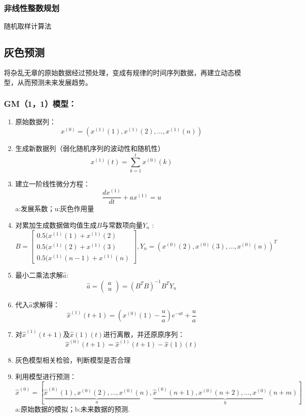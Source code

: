 \documentclass[12pt,a4paper]{article}
\begin{document}
\subsubsection{非线性整数规划}
随机取样计算法

\subsection{灰色预测}
将杂乱无章的原始数据经过预处理，变成有规律的时间序列数据，再建立动态模型，从而预测未来发展趋势。\\
\subsubsection{GM（1，1）模型：}
\begin{enumerate}
\item 原始数据列：
\begin{displaymath}
x^{(0)}=(x^{(1)}(1),x^{(1)}(2),\ldots ,x^{(1)}(n))
\end{displaymath}
\item 生成新数据列（弱化随机序列的波动性和随机性）
\begin{displaymath}
x^{(1)}(t)=\sum_{k=1}^{t} x^{(0)}(k)
\end{displaymath}
\item 建立一阶线性微分方程：
\begin{displaymath}
\frac{dx^{(1)}}{dt}+ax^{(1)}=u
\end{displaymath}
a:发展系数；u:灰色作用量\\
\item 对累加生成数据做均值生成$B$与常数项向量$Y_n$ :
\begin{displaymath}
B={
\left[\begin{array}{c}
0.5(x^{(1)}(1)+x^{(1)}(2)\\
0.5(x^{(1)}(2)+x^{(1)}(3)\\
0.5(x^{(1)}(n-1)+x^{(1)}(n)
\end{array}
\right]},
Y_n=(x^{(0)}(2),x^{(0)}(3),\ldots ,x^{(0)}(n))^T
\end{displaymath}
\item 最小二乘法求解$\hat a$:
$$\hat a=
\begin{pmatrix} a\\u
\end{pmatrix}
=(B^TB)^{-1}B^TY_n$$
\item 代入$\hat a$求解得：
$$\hat x^{(1)}(t+1)=(x^{(0)}(1)-\frac{u}a)e^{-at}+\frac{u}a$$
\item 对$\hat x^{(1)}(t+1)$及$\hat x{(1)}(t)$进行离散，并还原原序列：
$$\hat x^{(0)}(t+1)=\hat x^{(1)}(t+1)-\hat x{(1)}(t)$$
\item 灰色模型相关检验，判断模型是否合理
\item 利用模型进行预测：
\begin{displaymath}
\hat x^{(0)}=[\underbrace{\hat x^{(0)}(1),x^{(0)}(2),\ldots ,x^{(0)}(n)}_{a},\underbrace{\hat x^{(0)}(n+1),x^{(0)}(n+2),\ldots ,x^{(0)}(n+m)}_{b}]
\end{displaymath}
a:原始数据的模拟；b:未来数据的预测.
\end{enumerate}
\end{document}
